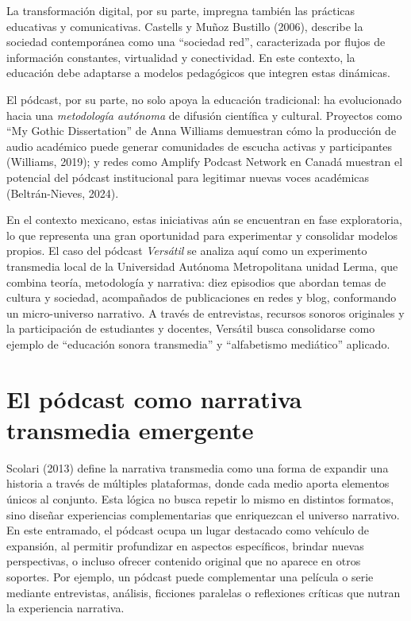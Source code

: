 \documentclass[
]{interact}
\begin{document}
La transformación digital, por su parte, impregna también las prácticas
educativas y comunicativas. Castells y Muñoz Bustillo (2006), describe
la sociedad contemporánea como una ``sociedad red'', caracterizada por
flujos de información constantes, virtualidad y conectividad. En este
contexto, la educación debe adaptarse a modelos pedagógicos que integren
estas dinámicas.

El pódcast, por su parte, no solo apoya la educación tradicional: ha
evolucionado hacia una \emph{metodología autónoma} de difusión
científica y cultural. Proyectos como ``My Gothic Dissertation'' de Anna
Williams demuestran cómo la producción de audio académico puede generar
comunidades de escucha activas y participantes (Williams, 2019); y redes
como Amplify Podcast Network en Canadá muestran el potencial del pódcast
institucional para legitimar nuevas voces académicas (Beltrán-Nieves,
2024).

En el contexto mexicano, estas iniciativas aún se encuentran en fase
exploratoria, lo que representa una gran oportunidad para experimentar y
consolidar modelos propios. El caso del pódcast \emph{Versátil} se
analiza aquí como un experimento transmedia local de la Universidad
Autónoma Metropolitana unidad Lerma, que combina teoría, metodología y
narrativa: diez episodios que abordan temas de cultura y sociedad,
acompañados de publicaciones en redes y blog, conformando un
micro-universo narrativo. A través de entrevistas, recursos sonoros
originales y la participación de estudiantes y docentes, Versátil busca
consolidarse como ejemplo de ``educación sonora transmedia'' y
``alfabetismo mediático'' aplicado.

\section{El pódcast como narrativa transmedia
emergente}\label{el-puxf3dcast-como-narrativa-transmedia-emergente}

Scolari (2013) define la narrativa transmedia como una forma de expandir
una historia a través de múltiples plataformas, donde cada medio aporta
elementos únicos al conjunto. Esta lógica no busca repetir lo mismo en
distintos formatos, sino diseñar experiencias complementarias que
enriquezcan el universo narrativo. En este entramado, el pódcast ocupa
un lugar destacado como vehículo de expansión, al permitir profundizar
en aspectos específicos, brindar nuevas perspectivas, o incluso ofrecer
contenido original que no aparece en otros soportes. Por ejemplo, un
pódcast puede complementar una película o serie mediante entrevistas,
análisis, ficciones paralelas o reflexiones críticas que nutran la
experiencia narrativa.
\end{document}
